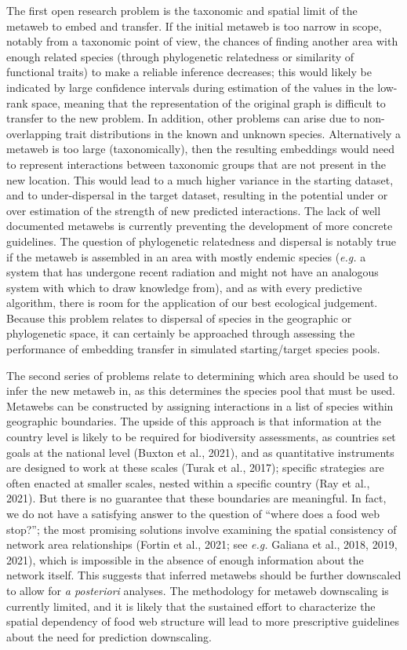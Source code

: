 \documentclass[10pt,oneside]{article}
\begin{document}
The first open research problem is the taxonomic and spatial limit of
the metaweb to embed and transfer. If the initial metaweb is too narrow
in scope, notably from a taxonomic point of view, the chances of finding
another area with enough related species (through phylogenetic
relatedness or similarity of functional traits) to make a reliable
inference decreases; this would likely be indicated by large confidence
intervals during estimation of the values in the low-rank space, meaning
that the representation of the original graph is difficult to transfer
to the new problem. In addition, other problems can arise due to
non-overlapping trait distributions in the known and unknown species.
Alternatively a metaweb is too large (taxonomically), then the resulting
embeddings would need to represent interactions between taxonomic groups
that are not present in the new location. This would lead to a much
higher variance in the starting dataset, and to under-dispersal in the
target dataset, resulting in the potential under or over estimation of
the strength of new predicted interactions. The lack of well documented
metawebs is currently preventing the development of more concrete
guidelines. The question of phylogenetic relatedness and dispersal is
notably true if the metaweb is assembled in an area with mostly endemic
species (\emph{e.g.} a system that has undergone recent radiation and
might not have an analogous system with which to draw knowledge from),
and as with every predictive algorithm, there is room for the
application of our best ecological judgement. Because this problem
relates to dispersal of species in the geographic or phylogenetic space,
it can certainly be approached through assessing the performance of
embedding transfer in simulated starting/target species pools.

The second series of problems relate to determining which area should be
used to infer the new metaweb in, as this determines the species pool
that must be used. Metawebs can be constructed by assigning interactions
in a list of species within geographic boundaries. The upside of this
approach is that information at the country level is likely to be
required for biodiversity assessments, as countries set goals at the
national level (Buxton et al., 2021), and as quantitative instruments
are designed to work at these scales (Turak et al., 2017); specific
strategies are often enacted at smaller scales, nested within a specific
country (Ray et al., 2021). But there is no guarantee that these
boundaries are meaningful. In fact, we do not have a satisfying answer
to the question of ``where does a food web stop?''; the most promising
solutions involve examining the spatial consistency of network area
relationships (Fortin et al., 2021; see \emph{e.g.} Galiana et al.,
2018, 2019, 2021), which is impossible in the absence of enough
information about the network itself. This suggests that inferred
metawebs should be further downscaled to allow for \emph{a posteriori}
analyses. The methodology for metaweb downscaling is currently limited,
and it is likely that the sustained effort to characterize the spatial
dependency of food web structure will lead to more prescriptive
guidelines about the need for prediction downscaling.
\end{document}
